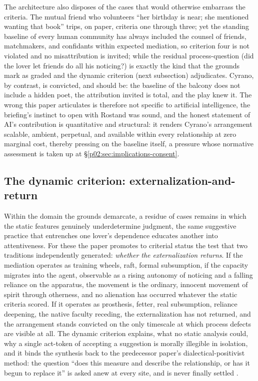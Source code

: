 \documentclass[11pt,a4paper]{article}
\begin{document}
The architecture also disposes of the cases that would otherwise embarrass the criteria. The mutual friend who volunteers ``her birthday is near; she mentioned wanting that book'' trips, on paper, criteria one through three; yet the standing baseline of every human community has always included the counsel of friends, matchmakers, and confidants within expected mediation, so criterion four is not violated and no misattribution is invited; while the residual process-question (did the lover let friends do all his noticing?) is exactly the kind that the grounds mark as graded and the dynamic criterion (next subsection) adjudicates. Cyrano, by contrast, is convicted, and should be: the baseline of the balcony does not include a hidden poet, the attribution invited is total, and the play knew it. The wrong this paper articulates is therefore not specific to artificial intelligence, the briefing's instinct to open with Rostand was sound, and the honest statement of AI's contribution is quantitative and structural: it renders Cyrano's arrangement scalable, ambient, perpetual, and available within every relationship at zero marginal cost, thereby pressing on the baseline itself, a pressure whose normative assessment is taken up at \S\ref{p02:sec:implications-consent}.

\subsection{The dynamic criterion: externalization-and-return}
\label{p02:sec:synthesis-dynamic}

Within the domain the grounds demarcate, a residue of cases remains in which the static features genuinely underdetermine judgment, the same suggestive practice that entrenches one lover's dependence educates another into attentiveness. For these the paper promotes to criterial status the test that two traditions independently generated: \emph{whether the externalization returns}. If the mediation operates as training wheels, raft, formal subsumption, if the capacity migrates into the agent, observable as a rising autonomy of noticing and a falling reliance on the apparatus, the movement is the ordinary, innocent movement of spirit through otherness, and no alienation has occurred whatever the static criteria scored. If it operates as prosthesis, fetter, real subsumption, reliance deepening, the native faculty receding, the externalization has not returned, and the arrangement stands convicted on the only timescale at which process defects are visible at all. The dynamic criterion explains, what no static analysis could, why a single act-token of accepting a suggestion is morally illegible in isolation, and it binds the synthesis back to the predecessor paper's dialectical-positivist method: the question ``does this measure and describe the relationship, or has it begun to replace it'' is asked anew at every site, and is never finally settled \parencite{huang2025toward}.
\end{document}
